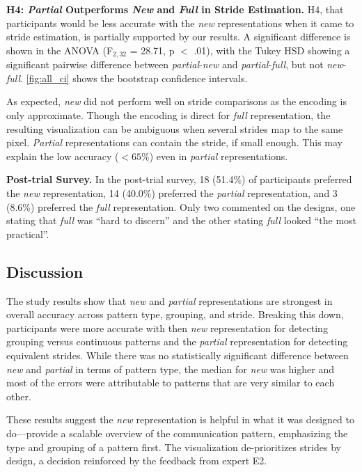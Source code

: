 \vspace{1ex}

\textbf{H4: {\em Partial} Outperforms {\em New} and {\em Full} in Stride Estimation.} H4, that participants would be less accurate with the {\em new} representations when it came to stride estimation, is partially supported by our results. A significant difference is shown in the ANOVA (F$_{2,32}$ = 28.71, p $<$ .01), with the Tukey HSD showing a significant pairwise difference between {\em partial}-{\em new} and {\em partial}-{\em full}, but not {\em new}-{\em full}. \autoref{fig:all_ci} shows the bootstrap confidence intervals.
  
    As expected, {\em new} did not perform well on stride comparisons as the encoding is only approximate. Though the encoding is direct for {\em full} representation, the resulting visualization can be ambiguous when several strides map to the same pixel. {\em Partial} representations can contain the stride, if small enough. This may explain the low accuracy ($<65$\%) even in {\em partial} representations.
    
    \vspace{1ex}

\textbf{Post-trial Survey.} In the post-trial survey, 18 (51.4\%) of participants preferred the {\em new} representation, 14 (40.0\%) preferred the {\em partial} representation, and 3 (8.6\%) preferred the {\em full} representation. Only two commented on the designs, one stating that {\em full} was ``hard to discern'' and the other stating {\em full} looked ``the most practical''.


\subsection{Discussion}
\label{sec:analysisdiscussion}

The study results show that  {\em new} and  {\em partial} representations are strongest in overall accuracy across pattern type, grouping, and stride. Breaking this down, participants were more accurate with then  {\em new} representation for detecting grouping versus continuous patterns and the  {\em partial}  representation for detecting equivalent strides. While there was no statistically significant difference between  {\em new} and  {\em partial} in terms of pattern type, the median for  {\em new} was higher and most of the errors were attributable to patterns that are very similar to each other.

These results suggest the  {\em new} representation is helpful in what it was designed to do---provide a scalable overview of the communication pattern, emphasizing the type and grouping of a pattern first. The visualization de-prioritizes strides by design, a decision reinforced by the feedback from expert E2.


